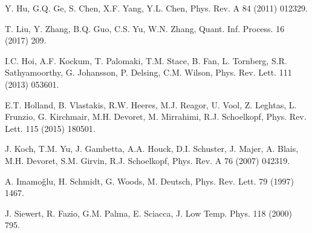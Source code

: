 \documentclass[preprintnumbers,showkeys,amsmath,amssymb]{revtex4}%
\begin{document}
\begin{thebibliography}{1}


 Y. Hu, G.Q. Ge, S. Chen, X.F. Yang, Y.L. Chen, Phys. Rev. A 84 (2011) 012329.

 T. Liu, Y. Zhang, B.Q. Guo, C.S. Yu, W.N. Zhang, Quant. Inf. Process. 16 (2017) 209.

 I.C. Hoi, A.F. Kockum, T. Palomaki, T.M. Stace, B. Fan, L. Tornberg, S.R. Sathyamoorthy, G. Johansson, P. Delsing, C.M. Wilson, Phys. Rev. Lett. 111 (2013) 053601.

 E.T. Holland, B. Vlastakis, R.W. Heeres, M.J. Reagor, U. Vool, Z. Leghtas, L. Frunzio, G. Kirchmair, M.H. Devoret, M. Mirrahimi, R.J. Schoelkopf, Phys. Rev. Lett. 115 (2015) 180501.

 J. Koch, T.M. Yu, J. Gambetta, A.A. Houck, D.I. Schuster, J. Majer, A. Blais, M.H. Devoret, S.M. Girvin, R.J. Schoelkopf, Phys. Rev. A 76 (2007) 042319.

 A. Imamo\v{g}lu, H. Schmidt, G. Woods, M. Deutsch, Phys. Rev. Lett. 79 (1997) 1467.

 J. Siewert, R. Fazio, G.M. Palma, E. Sciacca, J. Low Temp. Phys. 118 (2000) 795.



\end{thebibliography}
\end{document}

